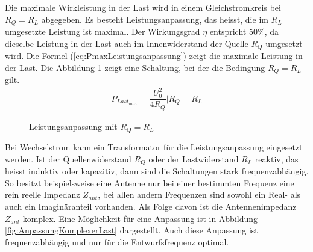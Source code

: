 Die maximale Wirkleistung in der Last wird in einem Gleichstromkreis bei $R_Q = R_L$ abgegeben. Es besteht Leistungsanpassung, das heisst, die im $R_L$ umgesetzte Leistung ist maximal. Der Wirkungsgrad $\eta$ entspricht $50\%$, da dieselbe Leistung in der Last auch im Innenwiderstand der Quelle $R_Q$ umgesetzt wird. Die Formel (\ref{eq:PmaxLeistungsanpassung}) zeigt die maximale Leistung in der Last. Die Abbildung \ref{fig:LeistungsanpassungU0_RQ_RL} zeigt eine Schaltung, bei der die Bedingung $R_Q = R_L$ gilt.
\begin{eqnarray}\label{eq:PmaxLeistungsanpassung}
P_{Last_{max}}=\dfrac{U_{0}^2}{4R_Q} | R_Q=R_L
\end{eqnarray}
\begin{figure}[!ht]
	\begin{center}
	\end{center}
\caption{Leistungsanpassung mit $R_Q = R_L$}
\label{fig:LeistungsanpassungU0_RQ_RL}
\end{figure}
\newpage
Bei Wechselstrom kann ein Transformator für die Leistungsanpassung eingesetzt werden. Ist der Quellenwiderstand $R_Q$ oder der Lastwiderstand $R_L$ reaktiv, das heisst induktiv oder kapazitiv, dann sind die Schaltungen stark frequenzabhängig. So besitzt beispielsweise eine Antenne nur bei einer bestimmten Frequenz eine rein reelle Impedanz $Z_{ant}$, bei allen andern Frequenzen sind sowohl ein Real- als auch ein Imaginäranteil vorhanden. Als Folge davon ist die Antennenimpedanz $Z_{ant}$ komplex. Eine Möglichkeit für eine Anpassung ist in Abbildung \ref{fig:AnpassungKomplexerLast} dargestellt. Auch diese Anpassung ist frequenzabhängig und nur für die Entwurfsfrequenz optimal.
